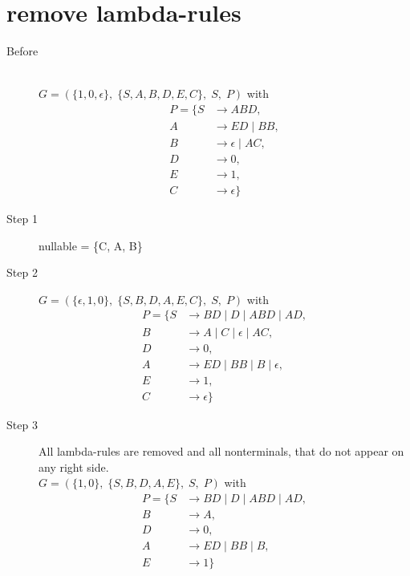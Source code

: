 \documentclass{article}
\begin{document}
\section{remove lambda-rules}
\begin{description}
	\item[Before] \hfill \\ 
	$G=\left(\{	1, 0, \epsilon\},\;\{ S, A, B, D, E, C\},\;S,\;P\right)$ with
	\begin{align*}
		P=\{	S &\rightarrow ABD, \\ 
		A &\rightarrow ED\;|\;BB, \\ 
		B &\rightarrow \epsilon\;|\;AC, \\ 
		D &\rightarrow 0, \\ 
		E &\rightarrow 1, \\ 
		C &\rightarrow \epsilon\}
	\end{align*}
	\item[Step 1] nullable = \{C, A, B\}
	\item[Step 2]
	$G=\left(\{	\epsilon, 1, 0\},\;\{ S, B, D, A, E, C\},\;S,\;P\right)$ with
	\begin{align*}
		P=\{	S &\rightarrow BD\;|\;D\;|\;ABD\;|\;AD, \\ 
		B &\rightarrow A\;|\;C\;|\;\epsilon\;|\;AC, \\ 
		D &\rightarrow 0, \\ 
		A &\rightarrow ED\;|\;BB\;|\;B\;|\;\epsilon, \\ 
		E &\rightarrow 1, \\ 
		C &\rightarrow \epsilon\}
	\end{align*}
	\item[Step 3] All lambda-rules are removed and all nonterminals, that do not appear on any right side. \\ 
	$G=\left(\{	1, 0\},\;\{ S, B, D, A, E\},\;S,\;P\right)$ with
	\begin{align*}
		P=\{	S &\rightarrow BD\;|\;D\;|\;ABD\;|\;AD, \\ 
		B &\rightarrow A, \\ 
		D &\rightarrow 0, \\ 
		A &\rightarrow ED\;|\;BB\;|\;B, \\ 
		E &\rightarrow 1\}
	\end{align*}
\end{description}
\end{document}
